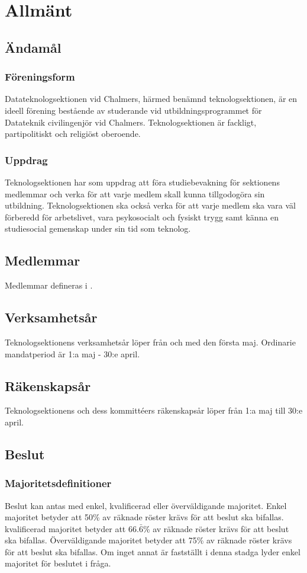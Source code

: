 \section{Allmänt}
\subsection{Ändamål}
\subsubsection{Föreningsform}
Datateknologsektionen vid Chalmers, härmed benämnd teknologsektionen, är en ideell förening bestående av studerande vid utbildningsprogrammet för Datateknik civilingenjör vid Chalmers.
Teknologsektionen är fackligt, partipolitiskt och religiöst oberoende.
\subsubsection{Uppdrag}
Teknologsektionen har som uppdrag att föra studiebevakning för sektionens medlemmar och verka för att varje medlem skall kunna tillgodogöra sin utbildning.
Teknologsektionen ska också verka för att varje medlem ska vara väl förberedd för arbetslivet, vara psykosocialt och fysiskt trygg samt känna en studiesocial gemenskap under sin tid som teknolog.
\subsection{Medlemmar}
Medlemmar defineras i .
\subsection{Verksamhetsår}
Teknologsektionens verksamhetsår löper från och med den första maj. Ordinarie mandatperiod är 1:a maj - 30:e april.
\subsection{Räkenskapsår}
Teknologsektionens och dess kommittéers räkenskapsår löper från 1:a maj till 30:e april.
\subsection{Beslut}
\label{sec:beslut}
\subsubsection{Majoritetsdefinitioner}
Beslut kan antas med enkel, kvalificerad eller överväldigande majoritet.
Enkel majoritet betyder att 50\% av räknade röster krävs för att beslut ska bifallas.
kvalificerad majoritet betyder att $66.\bar{6}$\% av räknade röster krävs för att beslut ska bifallas.
Överväldigande majoritet betyder att 75\% av räknade röster krävs för att beslut ska bifallas.
Om inget annat är fastställt i denna stadga lyder enkel majoritet för beslutet i fråga.
